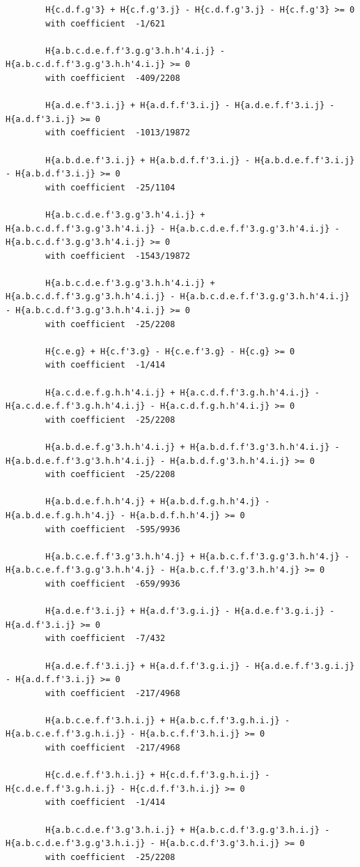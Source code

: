 \documentclass[11pt, a4paper]{kybernetika}
\begin{document}
\begin{verbatim}
		H{c.d.f.g'3} + H{c.f.g'3.j} - H{c.d.f.g'3.j} - H{c.f.g'3} >= 0
		with coefficient  -1/621
		
		H{a.b.c.d.e.f.f'3.g.g'3.h.h'4.i.j} - H{a.b.c.d.f.f'3.g.g'3.h.h'4.i.j} >= 0
		with coefficient  -409/2208
		
		H{a.d.e.f'3.i.j} + H{a.d.f.f'3.i.j} - H{a.d.e.f.f'3.i.j} - H{a.d.f'3.i.j} >= 0
		with coefficient  -1013/19872
		
		H{a.b.d.e.f'3.i.j} + H{a.b.d.f.f'3.i.j} - H{a.b.d.e.f.f'3.i.j} - H{a.b.d.f'3.i.j} >= 0
		with coefficient  -25/1104
		
		H{a.b.c.d.e.f'3.g.g'3.h'4.i.j} + H{a.b.c.d.f.f'3.g.g'3.h'4.i.j} - H{a.b.c.d.e.f.f'3.g.g'3.h'4.i.j} - H{a.b.c.d.f'3.g.g'3.h'4.i.j} >= 0
		with coefficient  -1543/19872
		
		H{a.b.c.d.e.f'3.g.g'3.h.h'4.i.j} + H{a.b.c.d.f.f'3.g.g'3.h.h'4.i.j} - H{a.b.c.d.e.f.f'3.g.g'3.h.h'4.i.j} - H{a.b.c.d.f'3.g.g'3.h.h'4.i.j} >= 0
		with coefficient  -25/2208
		
		H{c.e.g} + H{c.f'3.g} - H{c.e.f'3.g} - H{c.g} >= 0
		with coefficient  -1/414
		
		H{a.c.d.e.f.g.h.h'4.i.j} + H{a.c.d.f.f'3.g.h.h'4.i.j} - H{a.c.d.e.f.f'3.g.h.h'4.i.j} - H{a.c.d.f.g.h.h'4.i.j} >= 0
		with coefficient  -25/2208
		
		H{a.b.d.e.f.g'3.h.h'4.i.j} + H{a.b.d.f.f'3.g'3.h.h'4.i.j} - H{a.b.d.e.f.f'3.g'3.h.h'4.i.j} - H{a.b.d.f.g'3.h.h'4.i.j} >= 0
		with coefficient  -25/2208
		
		H{a.b.d.e.f.h.h'4.j} + H{a.b.d.f.g.h.h'4.j} - H{a.b.d.e.f.g.h.h'4.j} - H{a.b.d.f.h.h'4.j} >= 0
		with coefficient  -595/9936
		
		H{a.b.c.e.f.f'3.g'3.h.h'4.j} + H{a.b.c.f.f'3.g.g'3.h.h'4.j} - H{a.b.c.e.f.f'3.g.g'3.h.h'4.j} - H{a.b.c.f.f'3.g'3.h.h'4.j} >= 0
		with coefficient  -659/9936
		
		H{a.d.e.f'3.i.j} + H{a.d.f'3.g.i.j} - H{a.d.e.f'3.g.i.j} - H{a.d.f'3.i.j} >= 0
		with coefficient  -7/432
		
		H{a.d.e.f.f'3.i.j} + H{a.d.f.f'3.g.i.j} - H{a.d.e.f.f'3.g.i.j} - H{a.d.f.f'3.i.j} >= 0
		with coefficient  -217/4968
		
		H{a.b.c.e.f.f'3.h.i.j} + H{a.b.c.f.f'3.g.h.i.j} - H{a.b.c.e.f.f'3.g.h.i.j} - H{a.b.c.f.f'3.h.i.j} >= 0
		with coefficient  -217/4968
		
		H{c.d.e.f.f'3.h.i.j} + H{c.d.f.f'3.g.h.i.j} - H{c.d.e.f.f'3.g.h.i.j} - H{c.d.f.f'3.h.i.j} >= 0
		with coefficient  -1/414
		
		H{a.b.c.d.e.f'3.g'3.h.i.j} + H{a.b.c.d.f'3.g.g'3.h.i.j} - H{a.b.c.d.e.f'3.g.g'3.h.i.j} - H{a.b.c.d.f'3.g'3.h.i.j} >= 0
		with coefficient  -25/2208
		

\end{verbatim}
\end{document}
